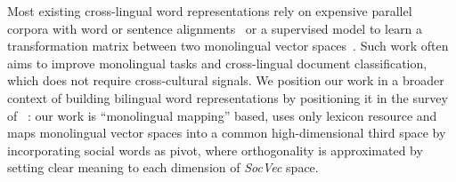 Most existing cross-lingual word representations  
rely on expensive parallel corpora with word or sentence 
alignments~\cite{klementiev2012inducing,kovcisky2014learning} or  a 
supervised model to learn a transformation matrix between two monolingual 
vector spaces~\cite{Mikolov:2013tp}. 
Such work often aims to improve monolingual tasks and cross-lingual 
document classification, which does not require cross-cultural signals. 
We position our work in a broader context of building bilingual word representations by positioning it in the survey of ~\citet{DBLP:journals/corr/Ruder17}: 
our work is ``monolingual mapping'' based, uses only lexicon resource and 
maps monolingual vector spaces into a common high-dimensional third space 
by incorporating social words as pivot, where orthogonality is 
approximated by setting clear meaning to each dimension 
of \textit{SocVec} space.
